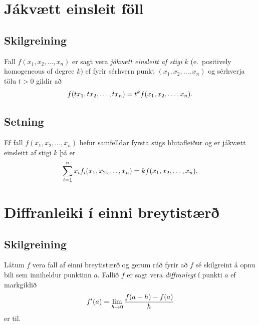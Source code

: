 \documentclass[a4paper,10pt,icelandic]{sphinxmanual}
\begin{document}
\section{Jákvætt einsleit föll}
\label{Kafli2:jakvaett-einsleit-foll}

\subsection{Skilgreining}
\label{Kafli2:index-13}\label{Kafli2:id24}
Fall \(f(x_1, x_2, \ldots, x_n)\) er sagt vera \emph{jákvætt einsleitt af
stigi} \(k\) (e. positively homogeneous of degree \(k\)) ef
fyrir sérhvern punkt \((x_1, x_2, \ldots, x_n)\) og sérhverja tölu
\(t>0\) gildir að
\begin{gather}
\begin{split}\displaystyle f(tx_1, tx_2, \ldots, tx_n)=t^kf(x_1, x_2, \ldots, x_n).\end{split}\notag
\end{gather}

\subsection{Setning}
\label{Kafli2:id25}
Ef fall \(f(x_1, x_2, \ldots, x_n)\) hefur samfelldar fyrsta stigs
hlutafleiður og er jákvætt einsleitt af stigi \(k\) þá er
\begin{gather}
\begin{split}\displaystyle \sum_{i=1}^n x_if_i(x_1, x_2, \ldots, x_n)=kf(x_1, x_2, \ldots, x_n).\end{split}\notag
\end{gather}

\section{Diffranleiki í einni breytistærð}
\label{Kafli2:diffranleiki-i-einni-breytistaer}

\subsection{Skilgreining}
\label{Kafli2:id26}
Látum \(f\) vera fall af einni breytistærð og gerum ráð fyrir að
\(f\) sé skilgreint á opnu bili sem inniheldur punktinn \(a\).
Fallið \(f\) er sagt vera \emph{diffranlegt} í punkti \(a\) ef
markgildið
\begin{gather}
\begin{split}\displaystyle f'(a)=\lim_{h\rightarrow 0}\frac{f(a+h)-f(a)}{h}\end{split}\notag
\end{gather}
er til.
\end{document}
